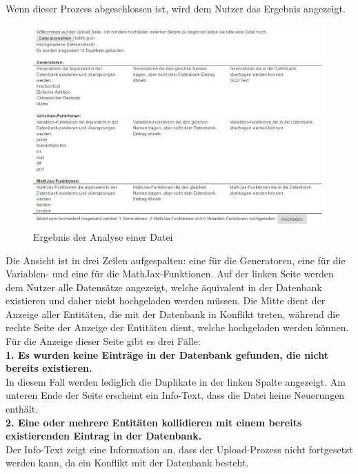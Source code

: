 Wenn dieser Prozess abgeschlossen ist, wird dem Nutzer das Ergebnis angezeigt.

\begin{figure}[htp]     %
\centering
\includegraphics[width=1\textwidth]{bilder/UploadEntities} 
\caption[Ergebnis der Analyse einer Datei]{Ergebnis der Analyse einer Datei}
\end{figure} 

Die Ansicht ist in drei Zeilen aufgespalten: eine für die Generatoren, eine für die Variablen- und eine für die MathJax-Funktionen. Auf der linken Seite werden dem Nutzer alle Datensätze angezeigt, welche äquivalent in der Datenbank existieren und daher nicht hochgeladen werden müssen. Die Mitte dient der Anzeige aller Entitäten, die mit der Datenbank in Konflikt treten, während die rechte Seite der Anzeige der Entitäten dient, welche hochgeladen werden können. \\

Für die Anzeige dieser Seite gibt es drei Fälle:\\

\noindent \textbf{1. Es wurden keine Einträge in der Datenbank gefunden, die nicht bereits existieren. } \\
In diesem Fall werden lediglich die Duplikate in der linken Spalte angezeigt. Am unteren Ende der Seite erscheint ein Info-Text, dass die Datei keine Neuerungen enthält. \\

\noindent \textbf{2. Eine oder mehrere Entitäten kollidieren mit einem bereits existierenden Eintrag in der Datenbank. } \\
Der Info-Text zeigt eine Information an, dass der Upload-Prozess nicht fortgesetzt werden kann, da ein Konflikt mit der Datenbank besteht. \\

